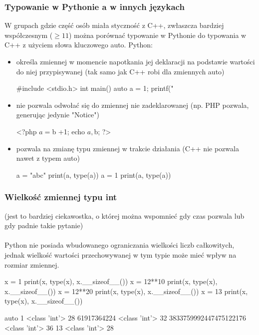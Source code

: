 \begin{teacherOnly}
\subsubsection{Typowanie w Pythonie a w innych językach {\Symbola 🤔}}
W grupach gdzie część osób miała styczność z C++, zwłaszcza bardziej współczesnym ($\ge 11$) można porównać typowanie w Pythonie do typowania w C++ z użyciem słowa kluczowego auto. Python:
\begin{itemize}
\item określa zmiennej w momencie napotkania jej deklaracji na podstawie wartości do niej przypisywanej (tak samo jak C++ robi dla zmiennych auto)
\begin{CodeFrame*}[cpp]{}
#include <stdio.h>
int main() {
  auto a = 1;
  printf("%
}
\end{CodeFrame*}
\item nie pozwala odwołać się do zmiennej nie zadeklarowanej (np. PHP pozwala, generując jedynie "Notice")
\begin{CodeFrame*}[php]{}
<?php
$a = $b +1;
echo $a, $b;
?>
\end{CodeFrame*}
\item pozwala na zmianę typu zmiennej w trakcie działania (C++ nie pozwala nawet z typem auto)
\begin{CodeFrame*}[python]{}
a = "abc"
print(a, type(a))
a = 1
print(a, type(a))
\end{CodeFrame*}
\end{itemize}

\subsubsection{Wielkość zmiennej typu int {\Symbola 🤔}}

(jest to bardziej ciekawostka, o której można wspomnieć gdy czas pozwala lub gdy padnie takie pytanie)\\ \\
Python nie posiada wbudowanego ograniczania wielkości liczb całkowitych, jednak wielkość wartości przechowywanej w tym typie może mieć wpływ na rozmiar zmiennej.

\begin{CodeFrame}[python]{0.45\textwidth}
x = 1
print(x, type(x), x.__sizeof__())
x = 12**10
print(x, type(x), x.__sizeof__())
x = 12**20
print(x, type(x), x.__sizeof__())
x = 13
print(x, type(x), x.__sizeof__())
\end{CodeFrame}
\begin{CodeFrame}{auto}
1 <class 'int'> 28
61917364224 <class 'int'> 32
3833759992447475122176 <class 'int'> 36
13 <class 'int'> 28
\end{CodeFrame}
\end{teacherOnly}
